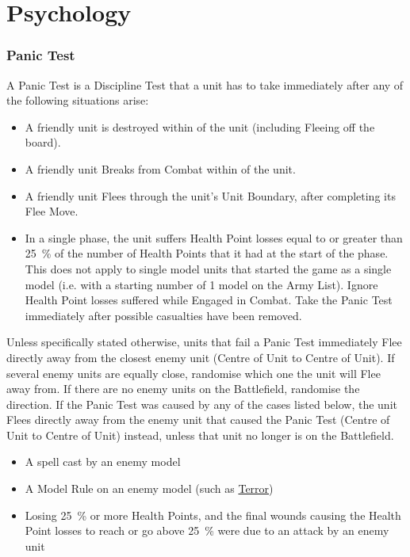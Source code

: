 
\part{Psychology}
\label{psychology}

\RBbmc

\section{Panic Test}
\label{panic_test}

A Panic Test is a Discipline Test that a unit has to take immediately after any of the following situations arise:

\begin{itemize}
\item A friendly unit is destroyed within  of the unit (including Fleeing off the board).
\item A friendly unit Breaks from Combat within  of the unit.
\item A friendly unit Flees through the unit's Unit Boundary, after completing its Flee Move.
\item In a single phase, the unit suffers Health Point losses equal to or greater than \SI{25}{\percent} of the number of Health Points that it had at the start of the phase. This does not apply to single model units that started the game as a single model (i.e. with a starting number of 1 model on the Army List). Ignore Health Point losses suffered while Engaged in Combat. Take the Panic Test immediately after possible casualties have been removed.
\end{itemize}

Unless specifically stated otherwise, units that fail a Panic Test immediately Flee directly away from the closest enemy unit (Centre of Unit to Centre of Unit). If several enemy units are equally close, randomise which one the unit will Flee away from. If there are no enemy units on the Battlefield, randomise the direction. If the Panic Test was caused by any of the cases listed below, the unit Flees directly away from the enemy unit that caused the Panic Test (Centre of Unit to Centre of Unit) instead, unless that unit no longer is on the Battlefield.
\begin{itemize}
\item A spell cast by an enemy model
\item A Model Rule on an enemy model (such as \hyperref[terror]{Terror})
\item Losing \SI{25}{\percent} or more Health Points, and the final wounds causing the Health Point losses to reach or go above \SI{25}{\percent} were due to an attack by an enemy unit
\end{itemize}

